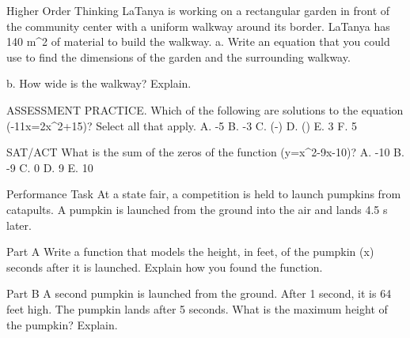 \documentclass{article}
\newenvironment{practice}[2]{}{}        %
\newcommand{\answer}[1]{}               %
\newcommand{\placeholder}[2]{}          %
\newcommand{\te}[1]{}                   %
\begin{document}
\begin{practice}{42}{2}
Higher Order Thinking LaTanya is working on a rectangular garden in front of the community center with a uniform walkway around its border. LaTanya has 140 m^2 of material to build the walkway.
a. Write an equation that you could use to find the dimensions of the garden and the surrounding walkway.
\answer{a. ((2x+9)(2x+14)=9\times14+140) or (4x^2+46x+126=266)}
b. How wide is the walkway? Explain.
\answer{b. 2.5 meters; (4x^2+46x+126=266); (4x^2+46x-140=0); (2(2x-5)(x+14)=0); (2x-5=0) or (x+14=0); (x=2.5) or (x=-14); The walkway must have a positive width, so it is 2.5 meters wide.}
\placeholder{diagram}{Top view rectangular green garden bordered uniformly by tan square paving stones. Inner garden vertical dimension on left labeled 9 meters and horizontal dimension along bottom labeled 14 meters, both double-arrowed. Shrubs and flowers fill garden with a narrow rectangular planter in center. Outer walkway width unmarked.}
\end{practice}
\begin{practice}{43}{1}
ASSESSMENT PRACTICE. Which of the following are solutions to the equation (-11x=2x^2+15)? Select all that apply.
A. -5
B. -3
C. (-)
D. ()
E. 3
F. 5
\answer{B, C}
\end{practice}
\begin{practice}{44}{2}
SAT/ACT What is the sum of the zeros of the function (y=x^2-9x-10)?
A. -10
B. -9
C. 0
D. 9
E. 10
\answer{D}
\end{practice}
\begin{practice}{45}{3}
Performance Task At a state fair, a competition is held to launch pumpkins from catapults. A pumpkin is launched from the ground into the air and lands 4.5 s later.
\placeholder{illustration}{Person operating a green catapult at a fair, pumpkin in air at upper right following an arcing trail. Callout to pumpkin: Max. height = 81 ft. Fields and hills in background.}
Part A Write a function that models the height, in feet, of the pumpkin (x) seconds after it is launched. Explain how you found the function.
\answer{Part A (y=-16x^2+72x); The zeros of the function are at 0 and 4.5, and the peak is halfway between, since it is a quadratic function, so the point (2.25,81) represents its peak; (y=ax(x-4.5)); (81=2.25a(2.25-4.5)); (81=-5.0625a); (-16=a); (y=-16x(x-4.5)); (y=-16x+72x)}
\te{Printed final expanded equation lacks the exponent on the first (x); an isolated superscript 2 appears below the answer block. The initial answer and factored equation give (y=-16x^2+72x).}
Part B A second pumpkin is launched from the ground. After 1 second, it is 64 feet high. The pumpkin lands after 5 seconds. What is the maximum height of the pumpkin? Explain.
\answer{Part B The pumpkin will reach 100 feet at 2.5 seconds.}
\end{practice}
\end{document}
